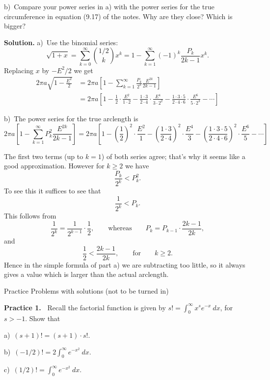 \documentclass[12pt]{article}
\theoremstyle{definition}
\theoremstyle{remark}
\theoremstyle{definition}
\newenvironment{Solution}{\noindent\textbf{Solution.}}{}
\begin{document}
b)\ Compare your power series in a) with the power series for the true circumference in equation (9.17) of the notes. Why are they close? Which is bigger?

\begin{Solution}
a)\ Use the binomial series:
\[
\sqrt{1+x}=\sum_{k=0}^\infty \binom{1/2}{k} x^k=
1-\sum_{k=1}^\infty (-1)^k\frac{P_k}{2k-1}x^k.
\]
Replacing $x$ by $-E^2/2$ we get
\[\begin{split}
2\pi a\sqrt{1-\frac{E^2}{2}}&=
2\pi a\left[ 1-\sum_{k=1}^\infty \frac{P_k}{2^{k}}\frac{E^{2k}}{2k-1}\right]\\
&=
2\pi a\left[1-\frac{1}{2}\cdot\frac{E^2}{1\cdot 2}-
\frac{1\cdot 3}{2\cdot 4}\cdot\frac{E^4}{3\cdot 2^2}-
\frac{1\cdot 3\cdot 5}{2\cdot 4\cdot 6}\cdot\frac{E^6}{5\cdot 2^3}-\cdots\right]
\end{split}
\]


b)\ The power series for the true arclength is 
\[
2\pi a\left[
1-\sum_{k=1}^\infty P_k^2\frac{E^{2k}}{2k-1}\right]=
2\pi a\left[
1-\left(\frac{1}{2}\right)^2\cdot \frac{E^2}{1}-
\left(\frac{1\cdot 3}{2\cdot 4}\right)^2\cdot \frac{E^4}{3}-
\left(\frac{1\cdot 3\cdot 5}{2\cdot 4\cdot 6}\right)^2\cdot \frac{E^6}{5}-\cdots\right]
\]

The first two terms (up to $k=1$) of both series agree; that's why it seems like a good approximation. However for $k\geq 2$ we have
\[\frac{P_k}{2^k}<P_k^2.\]
To see this it suffices to see that
\[\frac{1}{2^k}<P_k.\]
This follows from 
\[\frac{1}{2^k}=\frac{1}{2^{k-1}}\cdot\frac{1}{2},\qquad\text{whereas}\qquad P_k=P_{k-1}\cdot\frac{2k-1}{2k},
\]
and 
\[\frac{1}{2}<\frac{2k-1}{2k},\qquad\text{for}\qquad k\geq 2.\]
Hence in the simple formula of part a) we are subtracting too little, so it always gives a value which is larger than the actual arclength. 
\end{Solution} 







\newpage
Practice Problems with solutions (not to be turned in)

{\bf Practice 1.\ }  Recall the factorial function is given by $s!=\displaystyle \int_0^\infty x^s e^{-x}\ dx$, for $s>-1$. Show that 

a)\ $(s+1)!=(s+1)\cdot s!$. 

b)\ $(-1/2)!=2\int_0^\infty e^{-x^2}\ dx$. 

c)\ $(1/2)!=\int_0^\infty e^{-x^2}\ dx$. 
\end{document}
